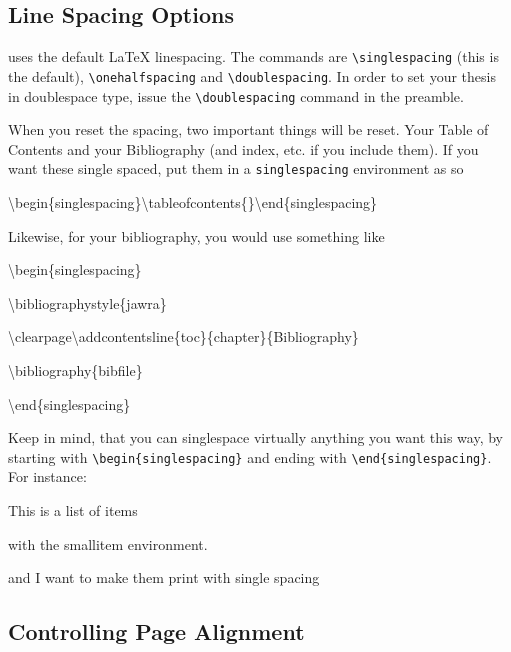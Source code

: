\subsection{Line Spacing Options}

\beavtex uses the default \LaTeX{} linespacing. The commands are
\texttt{\textbackslash{}singlespacing} (this is the default), \texttt{\textbackslash{}onehalfspacing}
and \texttt{\textbackslash{}doublespacing}. In order to set your thesis
in doublespace type, issue the \texttt{\textbackslash{}doublespacing}
command in the preamble.

When you reset the spacing, two important things will be reset. Your
Table of Contents and your Bibliography (and index, etc. if you include
them). If you want these single spaced, put them in a \texttt{singlespacing}
environment as so

\begin{lyxcode}
\textbackslash{}begin\{singlespacing\}\textbackslash{}tableofcontents\{\}\textbackslash{}end\{singlespacing\}
\end{lyxcode}
Likewise, for your bibliography, you would use something like

\begin{lyxcode}
\textbackslash{}begin\{singlespacing\}

\textbackslash{}bibliographystyle\{jawra\}

\textbackslash{}clearpage\textbackslash{}addcontentsline\{toc\}\{chapter\}\{Bibliography\}

\textbackslash{}bibliography\{bibfile\}

\textbackslash{}end\{singlespacing\}
\end{lyxcode}
Keep in mind, that you can singlespace virtually anything you want
this way, by starting with \texttt{\textbackslash{}begin\{singlespacing\}}
and ending with \texttt{\textbackslash{}end\{singlespacing\}}. For
instance:

\begin{singlespacing}

\begin{smallitem}
\item This is a list of items
\item with the smallitem environment.
\item and I want to make them print with single spacing
\end{smallitem}
\end{singlespacing}


\subsection{Controlling Page Alignment}

